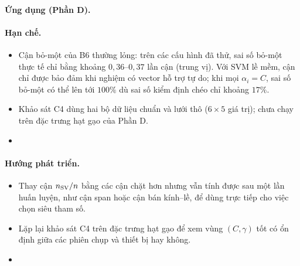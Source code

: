 \paragraph{Ứng dụng (Phần D).} 

\paragraph{Hạn chế.}
\begin{itemize}
  \item Cận bỏ-một của B6 thường lỏng: trên các cấu hình đã thử, sai số bỏ-một thực tế chỉ bằng khoảng
        $0{,}36$--$0{,}37$ lần cận (trung vị). Với SVM lề mềm, cận chỉ được bảo đảm khi nghiệm có vector
        hỗ trợ tự do; khi mọi $\alpha_i = C$, sai số bỏ-một có thể lên tới $100\%$ dù sai số kiểm định
        chéo chỉ khoảng $17\%$.
  \item Khảo sát C4 dùng hai bộ dữ liệu chuẩn và lưới thô ($6 \times 5$ giá trị); chưa chạy trên đặc
        trưng hạt gạo của Phần D.
  \item {}
\end{itemize}

\paragraph{Hướng phát triển.}
\begin{itemize}
  \item Thay cận $n_{\mathrm{SV}}/n$ bằng các cận chặt hơn nhưng vẫn tính được sau một lần huấn luyện, như cận
        span hoặc cận bán kính--lề, để dùng trực tiếp cho việc chọn siêu tham số.
  \item Lặp lại khảo sát C4 trên đặc trưng hạt gạo để xem vùng $(C, \gamma)$ tốt có ổn định giữa các
        phiên chụp và thiết bị hay không.
  \item {}
\end{itemize}
